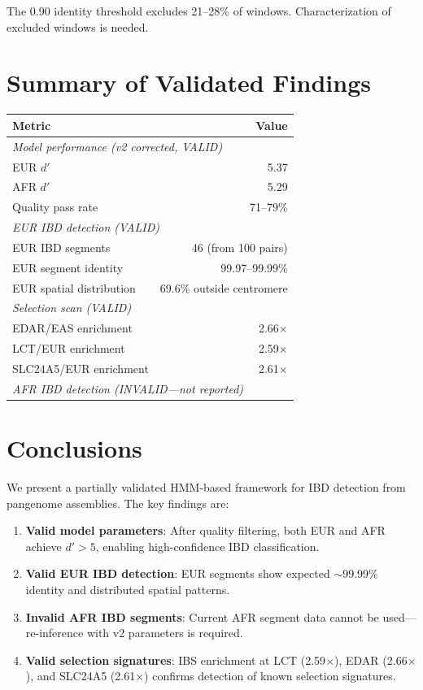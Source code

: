 \documentclass[11pt]{article}
\begin{document}
The 0.90 identity threshold excludes 21--28\% of windows. Characterization of excluded windows is needed.

\section{Summary of Validated Findings}

\begin{table}[H]
\centering
\begin{tabular}{@{}lr@{}}
\textbf{Metric} & \textbf{Value} \\
\midrule
\multicolumn{2}{l}{\textit{Model performance (v2 corrected, VALID)}} \\
EUR $d'$ & 5.37 \\
AFR $d'$ & 5.29 \\
Quality pass rate & 71--79\% \\
\midrule
\multicolumn{2}{l}{\textit{EUR IBD detection (VALID)}} \\
EUR IBD segments & 46 (from 100 pairs) \\
EUR segment identity & 99.97--99.99\% \\
EUR spatial distribution & 69.6\% outside centromere \\
\midrule
\multicolumn{2}{l}{\textit{Selection scan (VALID)}} \\
EDAR/EAS enrichment & 2.66$\times$ \\
LCT/EUR enrichment & 2.59$\times$ \\
SLC24A5/EUR enrichment & 2.61$\times$ \\
\midrule
\multicolumn{2}{l}{\textit{AFR IBD detection (INVALID---not reported)}} \\
\end{tabular}
\end{table}

\section{Conclusions}

We present a partially validated HMM-based framework for IBD detection from pangenome assemblies. The key findings are:

\begin{enumerate}
\item \textbf{Valid model parameters}: After quality filtering, both EUR and AFR achieve $d' > 5$, enabling high-confidence IBD classification.

\item \textbf{Valid EUR IBD detection}: EUR segments show expected $\sim$99.99\% identity and distributed spatial patterns.

\item \textbf{Invalid AFR IBD segments}: Current AFR segment data cannot be used---re-inference with v2 parameters is required.

\item \textbf{Valid selection signatures}: IBS enrichment at LCT (2.59$\times$), EDAR (2.66$\times$), and SLC24A5 (2.61$\times$) confirms detection of known selection signatures.
\end{enumerate}
\end{document}
